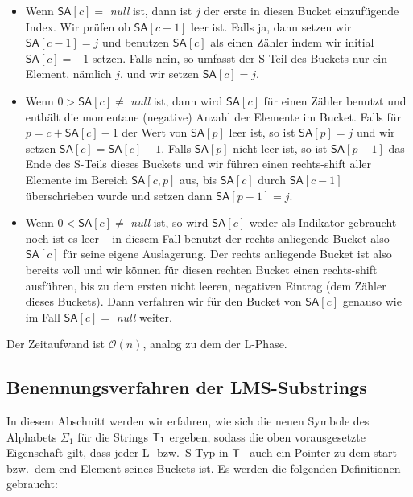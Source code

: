\begin{itemize}
\item Wenn $\mathsf{SA}[c] = $ \textit{null} ist, dann ist $j$ der erste in diesen Bucket einzufügende Index. Wir prüfen ob $\mathsf{SA}[c-1]$ leer ist. Falls ja, dann setzen wir $\mathsf{SA}[c-1] = j$ und benutzen $\mathsf{SA}[c]$ als einen Zähler indem wir initial $\mathsf{SA}[c] = -1$ setzen. Falls nein, so umfasst der S-Teil des Buckets nur ein Element, nämlich $j$, und wir setzen $\mathsf{SA}[c] = j$.
\item Wenn $ 0 > \mathsf{SA}[c] \neq$ \textit{null} ist, dann wird $\mathsf{SA}[c]$ für einen Zähler benutzt und enthält die momentane (negative) Anzahl der Elemente im Bucket. Falls für $p = c + \mathsf{SA}[c] - 1$ der Wert von $\mathsf{SA}[p]$ leer ist, so ist $\mathsf{SA}[p] = j$ und wir setzen $\mathsf{SA}[c] = \mathsf{SA}[c] - 1$. Falls $\mathsf{SA}[p]$ nicht leer ist, so ist $\mathsf{SA}[p-1]$ das Ende des S-Teils dieses Buckets und wir führen einen rechts-shift aller Elemente im Bereich $\mathsf{SA}[c, p]$ aus, bis $\mathsf{SA}[c]$ durch $\mathsf{SA}[c-1]$ überschrieben wurde und setzen dann $\mathsf{SA}[p-1] = j$.
\item Wenn $ 0 < \mathsf{SA}[c] \neq$ \textit{null} ist, so wird $\mathsf{SA}[c]$ weder als Indikator gebraucht noch ist es leer -- in diesem Fall benutzt der rechts anliegende Bucket also $\mathsf{SA}[c]$ für seine eigene Auslagerung. Der rechts anliegende Bucket ist also bereits voll und wir können für diesen rechten Bucket einen rechts-shift ausführen, bis zu dem ersten nicht leeren, negativen Eintrag (dem Zähler dieses Buckets). Dann verfahren wir für den Bucket von $\mathsf{SA}[c]$ genauso wie im Fall $\mathsf{SA}[c] = $ \textit{null} weiter.
\end{itemize}

Der Zeitaufwand ist $\mathcal O(n)$, analog zu dem der L-Phase.

\subsection{ Benennungsverfahren der LMS-Substrings}

In diesem Abschnitt werden wir erfahren, wie sich die neuen Symbole des Alphabets $\Sigma_1$ für die Strings $\inputtext_1$ ergeben, sodass die oben vorausgesetzte Eigenschaft gilt, dass jeder L- bzw.\ S-Typ in $\inputtext_1$ auch ein Pointer zu dem start- bzw.\ dem end-Element seines Buckets ist. Es werden die folgenden Definitionen gebraucht:

